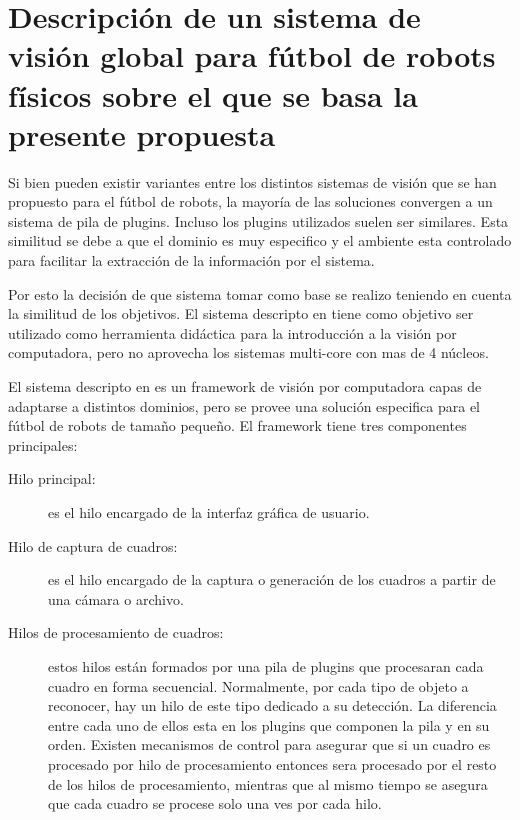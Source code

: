 
\section{Descripción de un sistema de visión global para fútbol de robots
físicos sobre el que se basa la presente propuesta}

Si bien pueden existir variantes entre los distintos sistemas de visión que se
han propuesto para el fútbol de robots, la mayoría de las soluciones convergen a
un sistema de pila de plugins. Incluso los plugins utilizados suelen ser
similares. Esta similitud se debe a que el dominio es muy especifico y el
ambiente esta controlado para facilitar la extracción de la información por el
sistema.

Por esto la decisión de que sistema tomar como base se realizo teniendo en
cuenta la similitud de los objetivos.
El sistema descripto en
\cite{torres2014} tiene como objetivo ser utilizado como herramienta
didáctica para la introducción a la visión por computadora, pero no aprovecha
los sistemas multi-core con mas de 4 núcleos.

El sistema descripto en \cite{torres2014} es un framework de visión por
computadora capas de adaptarse a distintos dominios, pero se provee una solución
especifica para el fútbol de robots de tamaño pequeño. El framework tiene tres
componentes principales:

\begin{description}

	\item[Hilo principal:] es el hilo encargado de la interfaz gráfica de
		usuario.
	
	\item[Hilo de captura de cuadros:] es el hilo encargado de la captura o
		generación de los cuadros a partir de una cámara o archivo.

	\item[Hilos de procesamiento de cuadros:] estos hilos están formados por
		una pila de plugins que procesaran cada cuadro en forma
		secuencial. Normalmente, por cada tipo de objeto a reconocer,
		hay un hilo de este tipo dedicado a su detección. La diferencia
		entre cada uno de ellos esta en los plugins que componen la pila
		y en su orden. Existen mecanismos de control para asegurar que
		si un cuadro es procesado por hilo de procesamiento entonces
		sera procesado por el resto de los hilos de procesamiento,
		mientras que al mismo tiempo se asegura que cada cuadro se
		procese solo una ves por cada hilo.

\end{description}

